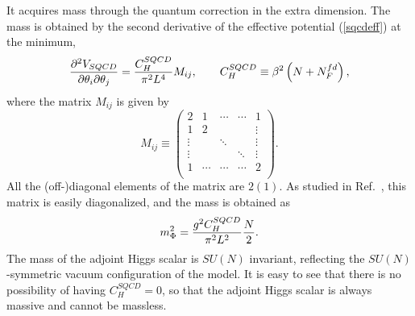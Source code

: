 \documentclass[a4paper,12pt]{article}
\begin{document}
It acquires mass through the quantum correction in the extra dimension.
The mass is obtained by the second derivative 
of the effective potential (\ref{sqcdeff}) at the minimum,
\begin{equation}
{{\partial^2V_{SQCD}}\over{\partial\theta_i\partial\theta_j}}
={{C_H^{SQCD}}\over{\pi^2 L^4}}M_{ij},\qquad C_H^{SQCD}\equiv 
\beta^2\left(N+N_F^{fd}\right),
\end{equation}
where the matrix $M_{ij}$ is given by
\begin{equation}
M_{ij}\equiv \left(\begin{array}{ccccc}
2&1&\cdots&\cdots& 1\\
1&2& & &\vdots\\
\vdots& &\ddots & &\vdots\\
\vdots& & & \ddots&\vdots\\
1&\cdots&\cdots&\cdots&2\\
\end{array}\right).
\label{matrix}
\end{equation}
All the (off-)diagonal elements of the matrix are $2(1)$.
As studied in Ref.~\cite{takenagab}, this matrix 
is easily diagonalized, and the mass is obtained as
\begin{equation}
m_{\Phi}^2={{g^2C_H^{SQCD}}\over{\pi^2 L^2}}{N\over 2}.
\end{equation}
The mass of the adjoint Higgs scalar is $SU(N)$ invariant, reflecting 
the $SU(N)$-symmetric vacuum configuration of the model. 
It is easy to see that there is no
possibility of having $C_H^{SQCD}=0$, so that the adjoint Higgs 
scalar is always massive and cannot be massless.
\end{document}
